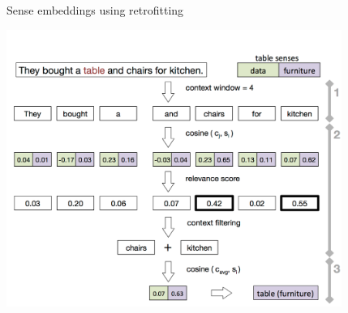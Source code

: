 \documentclass[usenames,dvipsnames]{beamer}
\begin{document}
	
\begin{frame}{Sense embeddings using retrofitting}
\vspace{-3em}
	\begin{center}
		\includegraphics[width=0.82\textwidth]{wsd}
	\end{center}
	
\end{frame}
\end{document}
